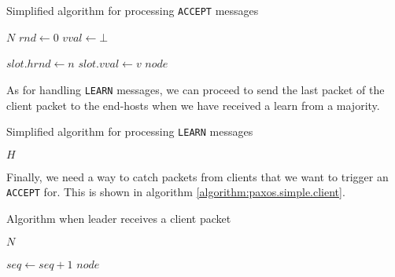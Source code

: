 \begin{algorithm}
  \caption{Simplified algorithm for processing \texttt{ACCEPT} messages}
  \label{algorithm:paxos.simple.acceptor}
  \begin{algorithmic}
    \State $N$
    \State $rnd \gets 0$ 
    \State $vval \gets \bot$ 
    \State

        \State $slot.hrnd\gets n$
        \State $slot.vval\gets v$ 
           \State {}
                         {$node$}
        \EndForIn
      \EndIf
    \EndOn
  \end{algorithmic}
\end{algorithm}

As for handling \texttt{LEARN} messages, we can proceed to send the last
packet of the client packet to the end-hosts when we have received a
learn from a majority.

\begin{algorithm}[H]
  \caption{Simplified algorithm for processing \texttt{LEARN} messages}
  \label{algorithm:paxos.simple.learner}
  \begin{algorithmic}
    \State $H$ 
    \State

          \State {}
        \EndForIn
      \EndIf
    \EndOn
  \end{algorithmic}
\end{algorithm}

Finally, we need a way to catch packets from clients that we want to trigger
an \texttt{ACCEPT} for.  This is shown in algorithm
\ref{algorithm:paxos.simple.client}.

\begin{algorithm}[H]
  \caption{Algorithm when leader receives a client packet}
  \label{algorithm:paxos.simple.client}
  \begin{algorithmic}
    \State $N$
    \State

      \State $seq \gets seq + 1$ 
        \State {}
                      {$node$}
      \EndForIn
    \EndOn
  \end{algorithmic}
\end{algorithm}
